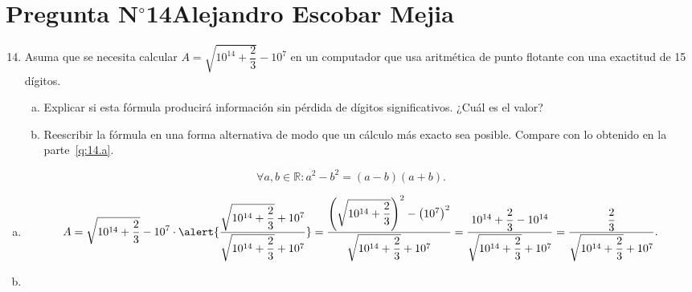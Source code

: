 \section{Pregunta N$^{\circ}$14\qquad Alejandro Escobar Mejia}

\begin{frame}
	\begin{enumerate}\setcounter{enumi}{13}
		\item

		      Asuma que se necesita calcular
		      \begin{math}
			      A=
			      \sqrt{10^{14}+\dfrac{2}{3}}-10^{7}
		      \end{math}
		      en un computador que usa aritmética de punto flotante con
		      una exactitud de 15 dígitos.

		      \begin{enumerate}[a)]
			      \item\label{q:14.a}

			      Explicar si esta fórmula producirá información sin
			      pérdida de dígitos significativos.
			      ¿Cuál es el valor?

			      \item\label{q:14.b}

			      Reescribir la fórmula en una forma alternativa de
			      modo que un cálculo más exacto sea posible.
			      Compare con lo obtenido en la parte~\eqref{q:14.a}.
		      \end{enumerate}
	\end{enumerate}

	\begin{solution}

		\begin{equation*}
			\forall a,b\in\mathbb{R}:
			a^{2}-b^{2}=
			\left(a-b\right)
			\left(a+b\right).
		\end{equation*}

		\begin{enumerate}[a)]
			\item
 \begin{equation*}
				      A=
				      \sqrt{10^{14}+\dfrac{2}{3}}-10^{7}\cdot
				      \alert{
				      \dfrac{
				      \sqrt{10^{14}+\dfrac{2}{3}}+10^{7}
				      }{
				      \sqrt{10^{14}+\dfrac{2}{3}}+10^{7}
				      }
				      }=
				      \dfrac{
				      \left(
				      \sqrt{10^{14}+\dfrac{2}{3}}
				      \right)^{2}
				      -{\left(
				      10^{7}
				      \right)}^{2}
				      }{
				      \sqrt{10^{14}+\dfrac{2}{3}}+10^{7}
				      }
				      =
				      \dfrac{
				      10^{14}+\dfrac{2}{3}-10^{14}
				      }{
				      \sqrt{10^{14}+\dfrac{2}{3}}+10^{7}
				      }=
				      \dfrac{\dfrac{2}{3}}{
				      \sqrt{10^{14}+\dfrac{2}{3}}+10^{7}
				      }.
			      \end{equation*}
			\item


\end{enumerate}
\end{solution}
\end{frame}
